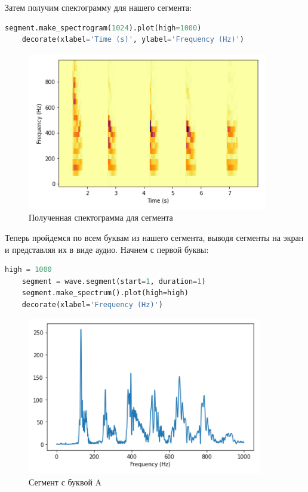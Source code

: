 \documentclass[a4paper]{article}
\begin{document}
            Затем получим спектограмму для нашего сегмента:
            
\begin{lstlisting}[language=Python, caption= Спектограмма для нашего сегмента]
    segment.make_spectrogram(1024).plot(high=1000)
    decorate(xlabel='Time (s)', ylabel='Frequency (Hz)')
\end{lstlisting}   
            
             \begin{figure}[H]
                \centering
                \includegraphics{ex_6_segment_spectogramma.png}
                \caption{Полученная спектограмма для сегмента}
                \label{fig:ex_6_segment_spectogramma}
            \end{figure}
            
            Теперь пройдемся по всем буквам из нашего сегмента, выводя сегменты на экран и представляя их в виде аудио. Начнем с первой буквы:
            
\begin{lstlisting}[language=Python, caption= Сегмент с буквой A]
    high = 1000
    segment = wave.segment(start=1, duration=1)
    segment.make_spectrum().plot(high=high)
    decorate(xlabel='Frequency (Hz)')
\end{lstlisting}   
            
             \begin{figure}[H]
                \centering
                \includegraphics{ex_6_letter_a_segment.png}
                \caption{Сегмент с буквой A}
                \label{fig:ex_6_letter_a_segment}
            \end{figure}
            
\end{document}

